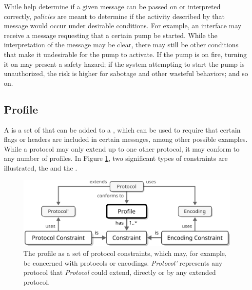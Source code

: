 While  help determine if a given message can be passed on or interpreted correctly, \textit{policies} are meant to determine if the activity described by that message would occur under desirable conditions.
For example, an interface may receive a message requesting that a certain pump be started.
While the interpretation of the message may be clear, there may still be other conditions that make it undesirable for the pump to activate.
If the pump is on fire, turning it on may present a safety hazard; if the system attempting to start the pump is unauthorized, the risk is higher for sabotage and other wasteful behaviors; and so on.

\subsection{Profile}
\label{sec:concepts:profile}

A  is a set of  that can be added to a , which can be used to require that certain flags or headers are included in certain messages, among other possible examples.
While a protocol may only extend up to one other protocol, it may conform to any number of profiles.
In Figure \ref{fig:profile}, two significant types of constraints are illustrated, the  and the .

\begin{figure}[ht!]
  \centering
  \includegraphics[scale=0.9]{figures/profile}
  \caption{
    The profile as a set of protocol constraints, which may, for example, be concerned with protocols or encodings.
    \textit{Protocol'} represents any protocol that \textit{Protocol} could extend, directly or by any extended protocol.
  }
  \label{fig:profile}
\end{figure}

